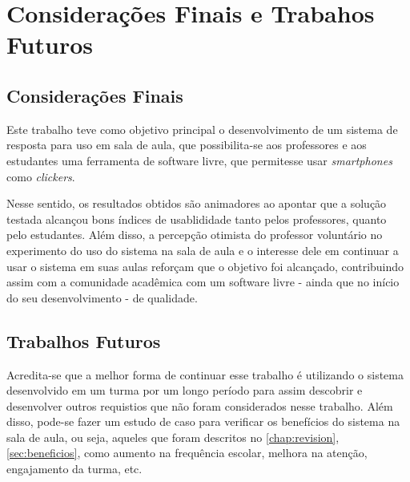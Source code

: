\chapter{Considerações Finais e Trabahos Futuros}\label{chap:final_thoughts}

\section{Considerações Finais}

Este trabalho teve como objetivo principal o desenvolvimento de um sistema de resposta para uso em sala de aula,
que possibilita-se aos professores e aos estudantes uma ferramenta de software livre,
que permitesse usar {\textit{smartphones}} como \textit{clickers}.

Nesse sentido, os resultados obtidos são animadores ao apontar que a solução testada alcançou bons índices
de usablididade tanto pelos professores, quanto pelo estudantes. Além disso, a percepção otimista
do professor voluntário no experimento do uso do sistema na sala de aula e o interesse dele
em continuar a usar o sistema em suas aulas reforçam que o objetivo foi alcançado, contribuindo assim
com a comunidade acadêmica com um software livre - ainda que no início do seu desenvolvimento - de qualidade.

\section{Trabalhos Futuros}

Acredita-se que a melhor forma de continuar esse trabalho é utilizando o sistema
desenvolvido em um turma por um longo período para assim descobrir e desenvolver outros requistios que não
foram considerados nesse trabalho. Além disso, pode-se fazer um estudo de caso para verificar os benefícios
do sistema na sala de aula, ou seja, aqueles que foram descritos no \autoref{chap:revision}, \autoref{sec:beneficios},
como aumento na frequência escolar, melhora na atenção, engajamento da turma, etc.
